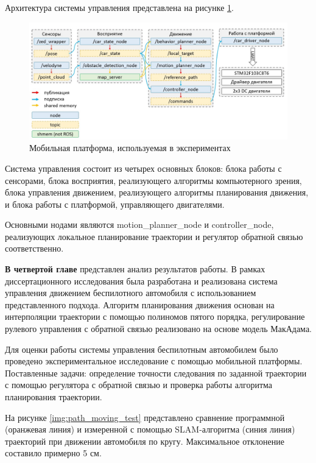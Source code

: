 Архитектура системы управления представлена на рисунке \ref{img:ros_arch}.

\begin{figure}[h]
    \centering
    \includegraphics[width=\textwidth]{images/ros_arch}
    \caption{Мобильная платформа, используемая в экспериментах}
    \label{img:ros_arch}
\end{figure}

Система управления состоит из четырех основных блоков: блока работы с сенсорами, блока восприятия,
реализующего алгоритмы компьютерного зрения, блока управления движением, реализующего алгоритмы
планирования движения, и блока работы с платформой, управляющего двигателями.

Основными нодами являются motion\_planner\_node и controller\_node, реализующих локальное планирование
траектории и регулятор обратной связью соответственно.

\textbf{В четвертой главе} представлен анализ результатов работы. В рамках диссертационного исследования
была разработана и реализована система управления движением беспилотного автомобиля с использованием
представленного подхода. Алгоритм планирования движения основан на интерполяции траектории с помощью
полиномов пятого порядка, регулирование рулевого управления с обратной связью реализовано на основе
модель МакАдама.

Для оценки работы системы управления беспилотным автомобилем было проведено экспериментальное исследование
с помощью мобильной платформы. Поставленные задачи: определение точности следования по заданной траектории
с помощью регулятора с обратной связью и проверка работы алгоритма планирования траектории.

На рисунке \ref{img:path_moving_test} представлено сравнение программной (оранжевая линия)
и измеренной с помощью SLAM-алгоритма (синия линия) траекторий при движении автомобиля по кругу.
Максимальное отклонение составило примерно 5 см.


